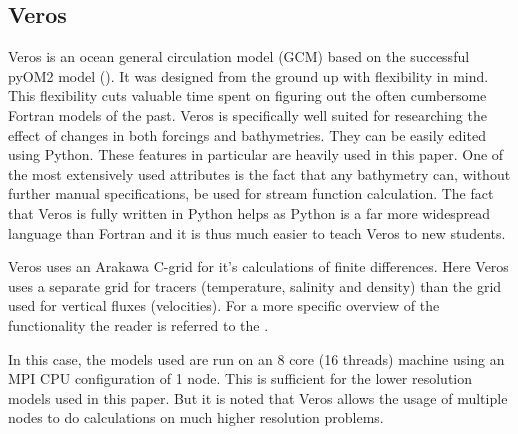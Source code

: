 \subsection{Veros}
Veros is an ocean general circulation model (GCM) based on the successful pyOM2 model (\cite{Hafner2018Aug}). It was designed from the ground up with flexibility in mind. This flexibility cuts valuable time spent on figuring out the often cumbersome Fortran models of the past. Veros is specifically well suited for researching the effect of changes in both forcings and bathymetries. They can be easily edited using Python. These features in particular are heavily used in this paper. One of the most extensively used attributes is the fact that any bathymetry can, without further manual specifications, be used for stream function calculation.
The fact that Veros is fully written in Python helps as Python is a far more widespread language than Fortran and it is thus much easier to teach Veros to new students. 

Veros uses an Arakawa C-grid for it's calculations of finite differences. Here Veros uses a separate grid for tracers (temperature, salinity and density) than the grid used for vertical fluxes (velocities). For a more specific overview of the functionality the reader is referred to the \cite{BibEntry2020Jun}.

In this case, the models used are run on an 8 core (16 threads) machine using an MPI CPU configuration of 1 node. This is sufficient for the lower resolution models used in this paper. But it is noted that Veros allows the usage of multiple nodes to do calculations on much higher resolution problems.

